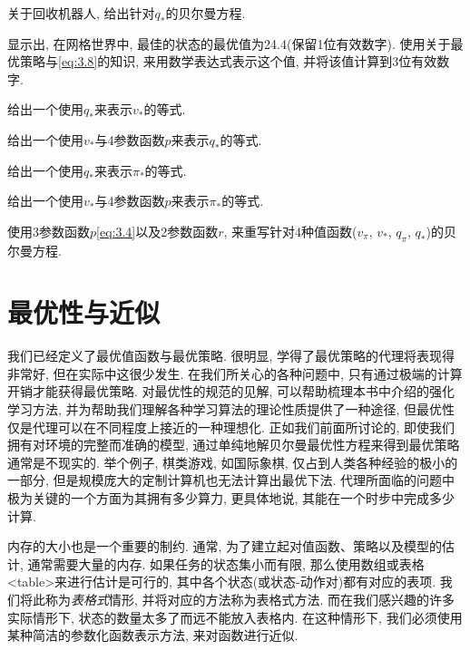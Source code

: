 \begin{exer}
关于回收机器人, 给出针对$q_*$的贝尔曼方程.
\end{exer}

\begin{exer}
显示出, 在网格世界中, 最佳的状态的最优值为24.4(保留1位有效数字). 使用关于最优策略与\eqref{eq:3.8}的知识, 来用数学表达式表示这个值, 并将该值计算到3位有效数字. 
\end{exer}

\begin{exer}
给出一个使用$q_*$来表示$v_*$的等式.
\end{exer}

\begin{exer}
给出一个使用$v_*$与4参数函数$p$来表示$q_*$的等式.
\end{exer}

\begin{exer}
给出一个使用$q_*$来表示$\pi_*$的等式.
\end{exer}

\begin{exer}
给出一个使用$v_*$与4参数函数$p$来表示$\pi_*$的等式.
\end{exer}

\begin{exer}
使用3参数函数$p$\eqref{eq:3.4}以及2参数函数$r$, 来重写针对4种值函数($v_\pi$, $v_*$, $q_\pi$, $q_*$)的贝尔曼方程.
\end{exer}

\section{最优性与近似}\label{sec:3.7}

我们已经定义了最优值函数与最优策略. 很明显, 学得了最优策略的代理将表现得非常好, 但在实际中这很少发生. 在我们所关心的各种问题中, 只有通过极端的计算开销才能获得最优策略. 对最优性的规范的见解, 可以帮助梳理本书中介绍的强化学习方法, 并为帮助我们理解各种学习算法的理论性质提供了一种途径, 但最优性仅是代理可以在不同程度上接近的一种理想化. 正如我们前面所讨论的, 即使我们拥有对环境的完整而准确的模型, 通过单纯地解贝尔曼最优性方程来得到最优策略通常是不现实的. 举个例子, 棋类游戏, 如国际象棋, 仅占到人类各种经验的极小的一部分, 但是规模庞大的定制计算机也无法计算出最优下法. 代理所面临的问题中极为关键的一个方面为其拥有多少算力, 更具体地说, 其能在一个时步中完成多少计算.

内存的大小也是一个重要的制约. 通常, 为了建立起对值函数、策略以及模型的估计, 通常需要大量的内存. 如果任务的状态集小而有限, 那么使用数组或表格<table>来进行估计是可行的, 其中各个状态(或状态-动作对)都有对应的表项. 我们将此称为\emph{表格式}情形, 并将对应的方法称为表格式方法. 而在我们感兴趣的许多实际情形下, 状态的数量太多了而远不能放入表格内. 在这种情形下, 我们必须使用某种简洁的参数化函数表示方法, 来对函数进行近似.

